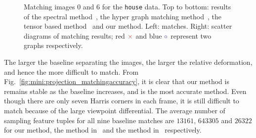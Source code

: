 \begin{figure}[!t]
        \addtocounter{subfigure}{-1}
        \begin{minipage}[b]{0.4\textwidth}
        \end{minipage}%
        \begin{minipage}[b]{0.4\textwidth}
        \end{minipage}%
        \caption{Matching images 0 and 6 for the \texttt{house} data. Top to bottom: results of the spectral method~\cite{Cour06}, the hyper graph matching method~\cite{Zass08}, the tensor based method~\cite{Duchenne_etal09} and our method. Left: matches. Right: scatter diagrams of matching results; red $\textcolor{red}{\times}$ and blue $\textcolor{blue}{\circ}$ represent two graphs respectively.}
\label{fig:mini:projection_matchingimages} %
\end{figure}%


The larger the baseline separating the images, the larger the relative deformation, and hence the more difficult to match. From Fig.~\ref{fig:mini:projection_matchingaccuracy}, it is clear that our method is remains stable as the baseline increases, and is the most accurate method. Even though there are only seven Harris corners in each frame, it is still difficult to match because of the large viewpoint differential. The average number of sampling feature tuples for all nine baseline matches are $13161$, $643305$ and $26322$ for our method, the method in~\cite{Duchenne_etal09} and  the method in~\cite{Zass08} respectively.
